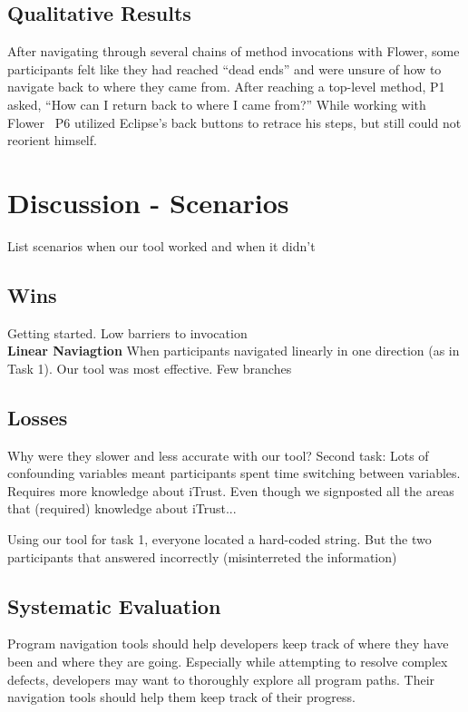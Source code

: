 \documentclass[conference]{IEEEtran}
\newcommand{\toolName}{Flower}
\begin{document}
\subsection{Qualitative Results}

After navigating through several chains of method invocations with \toolName, some participants felt like they had reached ``dead ends'' and were unsure of how to navigate back to where they came from. After reaching a top-level method, P1 asked, ``How can I return back to where I came from?'' While working with \toolName~ P6 utilized Eclipse's back buttons to retrace his steps, but still could not reorient himself. 




\section{Discussion - Scenarios}
List scenarios when our tool worked and when it didn't
\subsection{Wins}
Getting started. Low barriers to invocation
\\
\textbf{Linear Naviagtion}
When participants navigated linearly in one direction (as in Task 1). Our tool was most effective. 
Few branches



\subsection{Losses}
Why were they slower and less accurate with our tool?
Second task: 
Lots of confounding variables meant participants spent time switching between variables.
Requires more knowledge about iTrust. Even though we signposted all the areas that (required) knowledge about iTrust...

Using our tool for task 1, everyone located a hard-coded string. But the two participants that answered incorrectly (misinterreted the information)



\subsection{Systematic Evaluation}
Program navigation tools should help developers keep track of where they have been and where they are going. Especially while attempting to resolve complex defects, developers may want to thoroughly explore all program paths. Their navigation tools should help them keep track of their progress.
\end{document}
